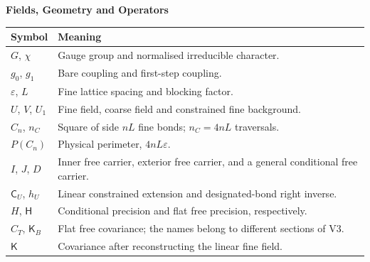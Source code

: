 \documentclass[11pt,a4paper]{article}
\newcommand{\subhead}[1]{\par\vspace{4pt}\textbf{\color{ink}#1}\par}
\begin{document}
\subhead{Fields, Geometry and Operators}
\begin{small}
    \begin{tabularx}{\textwidth}{@{}p{}X@{}}
        \toprule
        \textbf{Symbol} & \textbf{Meaning}\\
        \midrule
        $G$, $\chi$ & Gauge group and normalised irreducible character.\\[3pt]
        $g_0$, $g_1$ & Bare coupling and first-step coupling.\\[3pt]
        $\varepsilon$, $L$ & Fine lattice spacing and blocking factor.\\[3pt]
        $U$, $V$, $U_1$ & Fine field, coarse field and constrained fine background.\\[3pt]
        $C_n$, $n_C$ & Square of side $nL$ fine bonds; $n_C=4nL$ traversals.\\[3pt]
        $P(C_n)$ & Physical perimeter, $4nL\varepsilon$.\\[3pt]
        $I$, $J$, $D$ & Inner free carrier, exterior free carrier, and a general conditional free carrier.\\[3pt]
        $\mathsf C_U$, $h_U$ & Linear constrained extension and designated-bond right inverse.\\[3pt]
        $H$, $\mathsf H$ & Conditional precision and flat free precision, respectively.\\[3pt]
        $C_T$, $\mathsf K_B$ & Flat free covariance; the names belong to different sections of V3.\\[3pt]
        $\mathsf K$ & Covariance after reconstructing the linear fine field.\\
        \bottomrule
    \end{tabularx}
\end{small}
\end{document}
